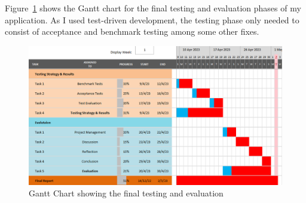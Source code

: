 \noindent Figure~\ref{fig:gantt-chart-3} shows the Gantt chart for the final testing and evaluation phases of my application. As I used test-driven development, the testing phase only needed to consist of acceptance and benchmark testing among some other fixes. 

\begin{figure}[H]
  \centering
  \includegraphics[width=\textwidth]{assets/images/charts/gantt/testing-eval.png}
  \caption{Gantt Chart showing the final testing and evaluation}
  \label{fig:gantt-chart-3}
\end{figure}